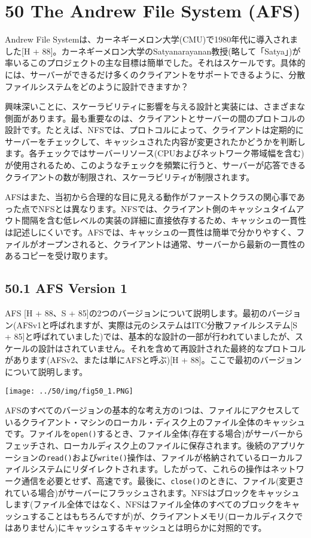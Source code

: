 \hypertarget{the-andrew-file-system-afs}{%
\section*{50 The Andrew File System
(AFS)}\label{the-andrew-file-system-afs}}

Andrew File
Systemは、カーネギーメロン大学(CMU)で1980年代に導入されました{[}H +
88{]}。カーネギーメロン大学のSatyanarayanan教授(略して「Satya」)が率いるこのプロジェクトの主な目標は簡単でした。それはスケールです。具体的には、サーバーができるだけ多くのクライアントをサポートできるように、分散ファイルシステムをどのように設計できますか？

興味深いことに、スケーラビリティに影響を与える設計と実装には、さまざまな側面があります。最も重要なのは、クライアントとサーバーの間のプロトコルの設計です。たとえば、NFSでは、プロトコルによって、クライアントは定期的にサーバーをチェックして、キャッシュされた内容が変更されたかどうかを判断します。各チェックではサーバーリソース(CPUおよびネットワーク帯域幅を含む)が使用されるため、このようなチェックを頻繁に行うと、サーバーが応答できるクライアントの数が制限され、スケーラビリティが制限されます。

AFSはまた、当初から合理的な目に見える動作がファーストクラスの関心事であった点でNFSとは異なります。NFSでは、クライアント側のキャッシュタイムアウト間隔を含む低レベルの実装の詳細に直接依存するため、キャッシュの一貫性は記述しにくいです。AFSでは、キャッシュの一貫性は簡単で分かりやすく、ファイルがオープンされると、クライアントは通常、サーバーから最新の一貫性のあるコピーを受け取ります。

\hypertarget{afs-version-1}{%
\subsection*{50.1 AFS Version 1}\label{afs-version-1}}

AFS {[}H + 88、S +
85{]}の2つのバージョンについて説明します。最初のバージョン(AFSv1と呼ばれますが、実際は元のシステムはITC分散ファイルシステム{[}S
+
85{]}と呼ばれていました)では、基本的な設計の一部が行われていましたが、スケールの設計はされていません。それを含めて再設計された最終的なプロトコルがあります(AFSv2、または単にAFSと呼ぶ){[}H
+ 88{]}。ここで最初のバージョンについて説明します。

\texttt{[image: ../50/img/fig50\_1.PNG]}

AFSのすべてのバージョンの基本的な考え方の1つは、ファイルにアクセスしているクライアント・マシンのローカル・ディスク上のファイル全体のキャッシュです。ファイルを\texttt{open()}するとき、ファイル全体(存在する場合)がサーバーからフェッチされ、ローカルディスク上のファイルに保存されます。後続のアプリケーションの\texttt{read()}および\texttt{write()}操作は、ファイルが格納されているローカルファイルシステムにリダイレクトされます。したがって、これらの操作はネットワーク通信を必要とせず、高速です。最後に、\texttt{close()}のときに、ファイル(変更されている場合)がサーバーにフラッシュされます。NFSはブロックをキャッシュします(ファイル全体ではなく、NFSはファイル全体のすべてのブロックをキャッシュすることはもちろんですが)が、クライアントメモリ(ローカルディスクではありません)にキャッシュするキャッシュとは明らかに対照的です。


